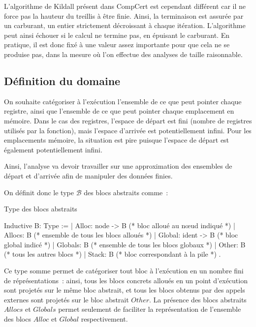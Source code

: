 \documentclass{article}
\newcommand\tB{\mathcal{B}}
\begin{document}
L'algorithme de Kildall présent dans CompCert est cependant différent car il ne
force pas la hauteur du treillis à être finie. Ainsi, la terminaison est
assurée par un carburant, un entier strictement décroissant à chaque itération.
L'algorithme peut ainsi échouer si le calcul ne termine pas, en épuisant le
carburant. En pratique, il est donc fixé à une valeur assez importante pour que
cela ne se produise pas, dans la mesure où l'on effectue des analyses de taille
raisonnable.

\subsection{Définition du domaine}

On souhaite catégoriser à l'exécution l'ensemble de ce que peut pointer chaque
registre, ainsi que l'ensemble de ce que peut pointer chaque emplacement en
mémoire. Dans le cas des registres, l'espace de départ est fini (nombre de
registres utilisés par la fonction), mais l'espace d'arrivée est
potentiellement infini. Pour les emplacements mémoire, la situation est pire
puisque l'espace de départ est également potentiellement infini.

Ainsi, l'analyse va devoir travailler sur une approximation des ensembles de
départ et d'arrivée afin de manipuler des données finies.

On définit donc le type $\tB$ des blocs abstraits comme~:

\begin{coqcode}
\caption{Type des blocs abstraits}
\begin{english}
\begin{coq}
Inductive B: Type :=
| Alloc:   node  -> B (* bloc alloué au nœud indiqué *)
| Allocs:           B (* ensemble de tous les blocs alloués *)
| Global:  ident -> B (* bloc global indicé *)
| Globals:          B (* ensemble de tous les blocs globaux *)
| Other:            B (* tous les autres blocs *)
| Stack:            B (* bloc correspondant à la pile *)
.
\end{coq}
\end{english}
\end{coqcode}

Ce type somme permet de catégoriser tout bloc à l'exécution en un nombre fini
de réprésentations~: ainsi, tous les blocs concrets alloués en un point
d'exécution sont projetés sur le même bloc abstrait, et tous les blocs obtenus
par des appels externes sont projetés sur le bloc abstrait $Other$.
La présence des blocs abstraits $Allocs$ et $Globals$
permet seulement de faciliter la représentation de l'ensemble des blocs
$Alloc$ et $Global$ respectivement.
\end{document}
